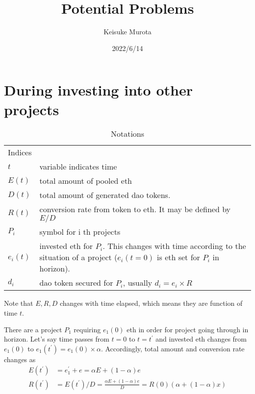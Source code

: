 \documentclass{jarticle}
\begin{document}
\title{Potential Problems}
\author{Keisuke Murota}
\date{2022/6/14}



\begin{titlepage}
\maketitle
\end{titlepage}
\setcounter{page}{1} %
\newpage
{}  %
\setcounter{page}{1} %


\section{During investing into other projects}
\begin{table}
\caption{Notations}
\begin{tabularx}{\textwidth}{@{}p{}X@{}}
\toprule
  Indices \\
  $t$ & variable indicates time\\
  $E(t)$ & total amount of pooled eth \\
  $D(t)$ & total amount of generated dao tokens. \\
  $R(t)$ & conversion rate from token to eth. It may be defined by $E/D$ \\
  $P_i$ & symbol for i th projects\\
  $e_i(t)$ & invested eth for $P_i$. This changes with time according to the situation of a project ($e_i(t=0)$ is eth set for $P_i$ in horizon).\\
  $d_i$ & dao token secured for $P_i$, usually $d_i = e_i \times R$\\
\bottomrule
\end{tabularx}
Note that $E, R, D $ changes with time elapsed, which means they are function of time $t$.
\end{table}

There are a project $P_1$ requiring $e_1(0)$ eth in order for project going through in horizon.
Let's say time passes from $t=0$ to $t=t^\prime$ and invested eth changes from $e_1(0)$ to $e_1(t^\prime) = e_1(0) \times \alpha$. Accordingly, total amount and conversion rate changes as 
\begin{align*}
    E(t^\prime) &= e_1^\prime + e = \alpha E + (1-\alpha)e\\
    R(t^\prime) &= E(t^\prime)/D = \frac{\alpha E + (1-\alpha)e}{D} = R(0)(\alpha + (1-\alpha)x)
\end{align*}
\end{document}
